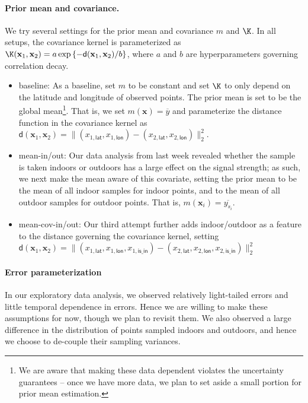 \documentclass{article}
\newcommand{\bl}{\mathbf}
\begin{document}
\paragraph{Prior mean and covariance.} We try several settings for the prior mean and covariance $m$ and $\K$. In all setups, the covariance kernel is parameterized as $\K(\bl{x}_1, \bl{x}_2) = a \exp\left\{-\mathsf{d}(\bl{x}_1, \bl{x}_2)/b \right\}$,
where $a$ and $b$ are hyperparameters governing correlation decay.
\begin{itemize}
    \setlength{\itemsep}{0ex}
    \item \textsf{baseline}: As a baseline, set $m$ to be constant and set $\K$ to only depend on the latitude and longitude of observed points. The prior mean is set to be the global mean\footnote{We are aware that making these data dependent violates the uncertainty guarantees -- once we have more data, we plan to set aside a small portion for prior mean estimation.}. That is, we set $m(\bl{x}) = \overline{y}$ and parameterize the distance function in the covariance kernel as $\mathsf{d}(\bl{x}_1, \bl{x}_2) = \|(x_{1,\mathsf{lat}}, x_{1,\mathsf{lon}}) - (x_{2,\mathsf{lat}}, x_{2,\mathsf{lon}})\|_2^2$. 

    \item \textsf{mean-in/out}: Our data analysis from last week revealed whether the sample is taken indoors or outdoors has a large effect on the signal strength; as such, we next make the mean aware of this covariate, setting the prior mean to be the mean of all indoor samples for indoor points, and to the mean of all outdoor samples for outdoor points. That is, $m(\bl{x}_i) = \overline{y_{s_i}}$.
    \item \textsf{mean-cov-in/out}: Our third attempt further adds indoor/outdoor as a feature to the distance governing the covariance kernel, setting $\mathsf{d}(\bl{x}_1, \bl{x}_2) = \|(x_{1,\mathsf{lat}}, x_{1,\mathsf{lon}}, x_{1,\mathsf{is\_in}}) - (x_{2,\mathsf{lat}}, x_{2,\mathsf{lon}}, x_{2,\mathsf{is\_in}})\|_2^2$
\end{itemize}


\paragraph{Error parameterization}
In our exploratory data analysis, we observed relatively light-tailed errors and little temporal dependence in errors. Hence we are willing to make these assumptions for now, though we plan to revisit them. We also observed a large difference in the distribution of points sampled indoors and outdoors, and hence we choose to de-couple their sampling variances. 
\end{document}
